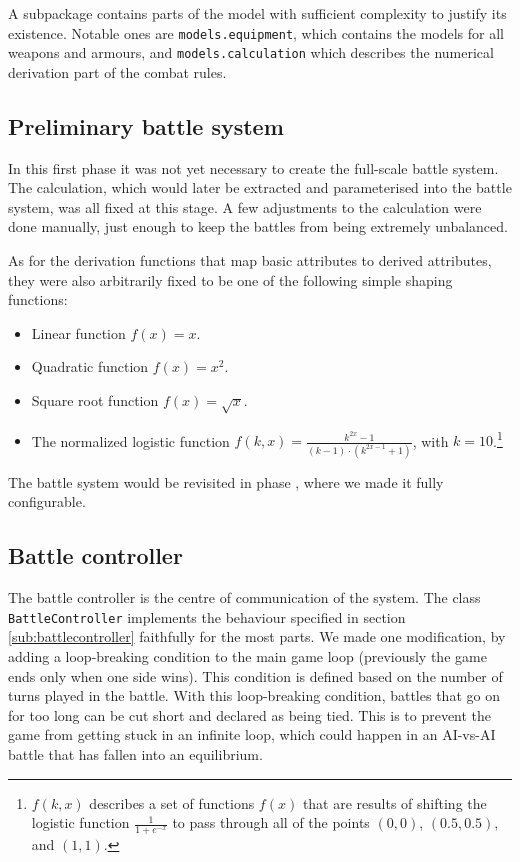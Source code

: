 A subpackage contains parts of the model with sufficient complexity to justify its existence. Notable ones are \texttt{models.equipment}, which contains the models for all weapons and armours, and \texttt{models.calculation} which describes the numerical derivation part of the combat rules.

\subsection{Preliminary battle system}

In this first phase it was not yet necessary to create the full-scale battle system. The calculation, which would later be extracted and parameterised into the battle system, was all fixed at this stage. A few adjustments to the calculation were done manually, just enough to keep the battles from being extremely unbalanced.

As for the derivation functions that map basic attributes to derived attributes, they were also arbitrarily fixed to be one of the following simple shaping functions:
\begin{itemize}
	\item Linear function $f(x) = x$.
	\item Quadratic function $f(x) = x^2$.
	\item Square root function $f(x) = \sqrt{x}$.
	\item The normalized logistic function $f(k, x) = \frac{k^{2x}-1}{(k-1) \cdot (k^{2x-1} + 1)}$, with $k = 10$.\footnote{$f(k, x)$ describes a set of functions $f(x)$ that are results of shifting the logistic function $\frac{1}{1 + e^{-x}}$ to pass through all of the points $(0, 0)$, $(0.5, 0.5)$, and $(1, 1)$.}
\end{itemize}

The battle system would be revisited in phase , where we made it fully configurable.

\subsection{Battle controller}

The battle controller is the centre of communication of the system. The class \texttt{BattleController} implements the behaviour specified in section \ref{sub:battlecontroller} faithfully for the most parts. We made one modification, by adding a loop-breaking condition to the main game loop (previously the game ends only when one side wins). This condition is defined based on the number of turns played in the battle. With this loop-breaking condition, battles that go on for too long can be cut short and declared as being tied. This is to prevent the game from getting stuck in an infinite loop, which could happen in an AI-vs-AI battle that has fallen into an equilibrium.

